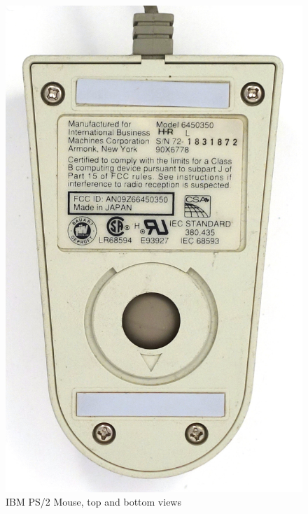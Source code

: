 \documentclass[11pt, a4paper]{article}
\begin{document}
\begin{figure}[h]
    \includegraphics[scale=0.6]{1987_ibm_ps2_mouse/num2.JPG}
    \caption{IBM PS/2 Mouse, top and bottom views}
    \label{fig:IMBPS2TopBottom}
\end{figure}
\end{document}
